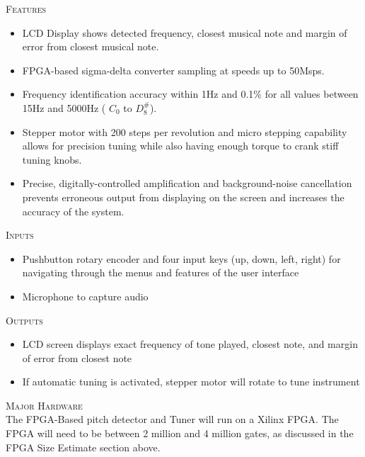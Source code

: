 \documentclass[aps,letterpaper,10pt]{revtex4}
\begin{document}
\noindent \textsc{\large Features}\\

\begin{itemize}
\item LCD Display shows detected frequency, closest musical note and margin of error from closest musical note. 
\item FPGA-based sigma-delta converter sampling at speeds up to 50Msps.
\item Frequency identification accuracy within 1Hz and 0.1\% for all values between 15Hz and 5000Hz ( $C_0$ to $D^\#_8$).
\item Stepper motor with 200 steps per revolution and micro stepping capability allows for precision tuning while also having enough torque to crank stiff tuning knobs. 
\item Precise, digitally-controlled amplification and background-noise cancellation prevents erroneous output from displaying on the screen and increases the accuracy of the system.
\end{itemize}

\noindent \textsc{\large Inputs}\\

\begin{itemize}
\item Pushbutton rotary encoder and four input keys (up, down, left, right) for navigating through the menus and features of the user interface
\item Microphone to capture audio
\end{itemize}

\noindent \textsc{\large Outputs}\\

\begin{itemize}
\item LCD screen displays exact frequency of tone played, closest note, and margin of error from closest note
\item If automatic tuning is activated, stepper motor will rotate to tune instrument
\end{itemize}

\noindent \textsc{\large Major Hardware}\\

The FPGA-Based pitch detector and Tuner will run on a Xilinx FPGA. The FPGA will need to be between 2 million and 4 million gates, as discussed in the FPGA Size Estimate section above. \\
\end{document}
